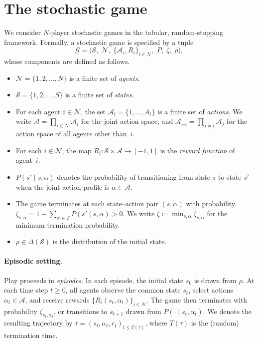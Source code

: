 \documentclass[a4paper,oneside,11pt]{report}
\newcommand{\calS}{\mathcal{S}}
\newcommand{\calN}{\mathcal{N}}
\newcommand{\calA}{\mathcal{A}}
\newcommand{\calG}{\mathcal{G}}
\numberwithin{theorem}{chapter}
\numberwithin{equation}{chapter}
\begin{document}
\section{The stochastic game}
\label{sec:game}

We consider $N$-player stochastic games in the tabular, random-stopping
framework. Formally, a stochastic game is specified by a tuple
\begin{equation}
  \label{eq:game-tuple}
  \calG = \bigl(\calS,\; \calN,\; \{\calA_i, R_i\}_{i \in \calN},\;
  P,\; \zeta,\; \rho\bigr),
\end{equation}
whose components are defined as follows.
\begin{itemize}
\item $\calN = \{1, 2, \ldots, N\}$ is a finite set of \emph{agents}.
\item $\calS = \{1, 2, \ldots, S\}$ is a finite set of \emph{states}.
\item For each agent $i \in \calN$, the set
  $\calA_i = \{1, \ldots, A_i\}$ is a finite set of \emph{actions}. We
  write $\calA = \prod_{i \in \calN} \calA_i$ for the joint action
  space, and $\calA_{-i} = \prod_{j \neq i} \calA_j$ for the action
  space of all agents other than~$i$.
\item For each $i \in \calN$, the map $R_i \colon \calS \times \calA \to [-1,1]$
  is the \emph{reward function} of agent~$i$.
\item $P(s' \mid s, \alpha)$ denotes the probability of transitioning
  from state $s$ to state $s'$ when the joint action profile is
  $\alpha \in \calA$.
\item The game terminates at each state--action pair $(s,\alpha)$ with
  probability
  $\zeta_{s,\alpha} = 1 - \sum_{s' \in \calS} P(s' \mid s, \alpha) > 0$.
  We write $\zeta \coloneqq \min_{s,\alpha} \zeta_{s,\alpha}$ for the
  minimum termination probability.
\item $\rho \in \Delta(\calS)$ is the distribution of the initial state.
\end{itemize}

\paragraph{Episodic setting.}
Play proceeds in \emph{episodes}. In each episode, the initial state
$s_0$ is drawn from $\rho$. At each time step $t \ge 0$, all agents
observe the common state $s_t$, select actions $\alpha_t \in \calA$, and
receive rewards $\{R_i(s_t, \alpha_t)\}_{i \in \calN}$. The game then
terminates with probability $\zeta_{s_t, \alpha_t}$, or transitions to
$s_{t+1}$ drawn from $P(\cdot \mid s_t, \alpha_t)$. We denote the
resulting trajectory by
$\tau = (s_t, \alpha_t, r_t)_{t \le T(\tau)}$, where $T(\tau)$ is the
(random) termination time.
\end{document}
